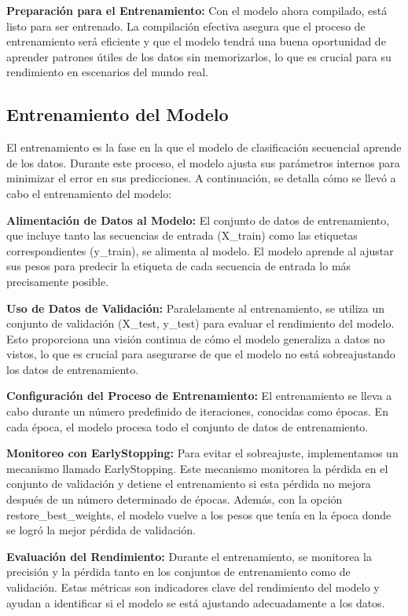 \textbf{Preparación para el Entrenamiento:} Con el modelo ahora compilado, está listo para ser entrenado. La compilación efectiva asegura que el proceso de entrenamiento será eficiente y que el modelo tendrá una buena oportunidad de aprender patrones útiles de los datos sin memorizarlos, lo que es crucial para su rendimiento en escenarios del mundo real.


\subsection{Entrenamiento del Modelo}

El entrenamiento es la fase en la que el modelo de clasificación secuencial aprende de los datos. Durante este proceso, el modelo ajusta sus parámetros internos para minimizar el error en sus predicciones. A continuación, se detalla cómo se llevó a cabo el entrenamiento del modelo:


\textbf{Alimentación de Datos al Modelo:} El conjunto de datos de entrenamiento, que incluye tanto las secuencias de entrada (X\_train) como las etiquetas correspondientes (y\_train), se alimenta al modelo. El modelo aprende al ajustar sus pesos para predecir la etiqueta de cada secuencia de entrada lo más precisamente posible.

\textbf{Uso de Datos de Validación:} Paralelamente al entrenamiento, se utiliza un conjunto de validación (X\_test, y\_test) para evaluar el rendimiento del modelo. Esto proporciona una visión continua de cómo el modelo generaliza a datos no vistos, lo que es crucial para asegurarse de que el modelo no está sobreajustando los datos de entrenamiento.

\textbf{Configuración del Proceso de Entrenamiento:} El entrenamiento se lleva a cabo durante un número predefinido de iteraciones, conocidas como épocas. En cada época, el modelo procesa todo el conjunto de datos de entrenamiento.

\textbf{Monitoreo con EarlyStopping:} Para evitar el sobreajuste, implementamos un mecanismo llamado EarlyStopping. Este mecanismo monitorea la pérdida en el conjunto de validación y detiene el entrenamiento si esta pérdida no mejora después de un número determinado de épocas. Además, con la opción restore\_best\_weights, el modelo vuelve a los pesos que tenía en la época donde se logró la mejor pérdida de validación.

\textbf{Evaluación del Rendimiento:} Durante el entrenamiento, se monitorea la precisión y la pérdida tanto en los conjuntos de entrenamiento como de validación. Estas métricas son indicadores clave del rendimiento del modelo y ayudan a identificar si el modelo se está ajustando adecuadamente a los datos.

